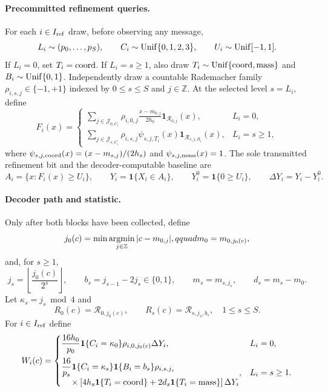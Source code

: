\paragraph{Precommitted refinement queries.}
For each $i\in I_{\rm ref}$ draw, before observing any message,
\[
L_i\sim(p_0,\ldots,p_S),\qquad
C_i\sim{\rm Unif}\{0,1,2,3\},\qquad
U_i\sim{\rm Unif}[-1,1].
\]
If $L_i=0$, set $T_i={\rm coord}$.  If $L_i=s\geq1$, also draw
$T_i\sim{\rm Unif}\{{\rm coord},{\rm mass}\}$ and
$B_i\sim{\rm Unif}\{0,1\}$.  Independently draw a countable Rademacher
family $\rho_{i,s,j}\in\{-1,+1\}$ indexed by $0\leq s\leq S$ and
$j\in\mathbb Z$.  At the selected level $s=L_i$, define
\[
F_i(x)=
\begin{cases}
\displaystyle
\sum_{j\in\mathcal J_{0,C_i}}\rho_{i,0,j}
  \frac{x-m_{0,j}}{2h_0}\mathbf 1_{\mathcal R_{0,j}}(x),&L_i=0,\\[1em]
\displaystyle
\sum_{j\in\mathcal J_{s,C_i}}\rho_{i,s,j}
  \psi_{s,j,T_i}(x)\mathbf 1_{\mathcal R_{s,j,B_i}}(x),&L_i=s\geq1,
\end{cases}
\]
where
$\psi_{s,j,{\rm coord}}(x)=(x-m_{s,j})/(2h_s)$ and
$\psi_{s,j,{\rm mass}}(x)=1$.  The sole transmitted refinement bit and
the decoder-computable baseline are
\[
A_i=\{x:F_i(x)\geq U_i\},\qquad
Y_i=\mathbf 1\{X_i\in A_i\},\qquad
Y_i^0=\mathbf 1\{0\geq U_i\},\qquad
\Delta Y_i=Y_i-Y_i^0.
\]

\paragraph{Decoder path and statistic.}
Only after both blocks have been collected, define
\[
j_0(c)=\min\mathop{\rm argmin}_{j\in\mathbb Z}|c-m_{0,j}|,qquad
m_0=m_{0,j_0(c)},
\]
and, for $s\geq1$,
\[
j_s=\left\lfloor\frac{j_0(c)}{2^s}\right\rfloor,
\qquad b_s=j_{s-1}-2j_s\in\{0,1\},\qquad
m_s=m_{s,j_s},\qquad d_s=m_s-m_0.
\]
Let $\kappa_s=j_s\bmod4$ and
\[
R_0(c)=\mathcal R_{0,j_0(c)},\qquad
R_s(c)=\mathcal R_{s,j_s,b_s},\quad 1\leq s\leq S.
\]
For $i\in I_{\rm ref}$ define
\[
W_i(c)=
\begin{cases}
\displaystyle
\frac{16h_0}{p_0}\mathbf 1\{C_i=\kappa_0\}
 \rho_{i,0,j_0(c)}\Delta Y_i,&L_i=0,\\[1em]
\displaystyle
\begin{aligned}
&\frac{16}{p_s}\mathbf 1\{C_i=\kappa_s\}
 \mathbf 1\{B_i=b_s\}\rho_{i,s,j_s}\\[-0.2em]
&\quad{}\times\left[4h_s\mathbf 1\{T_i={\rm coord}\}
 +2d_s\mathbf 1\{T_i={\rm mass}\}\right]\Delta Y_i
\end{aligned},
 &L_i=s\geq1.
\end{cases}
\]

